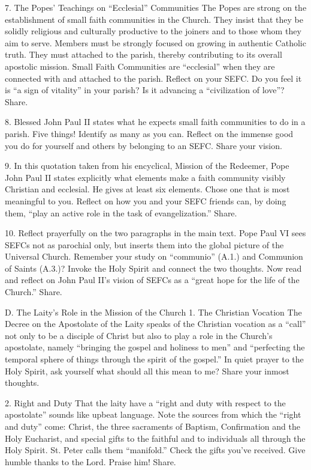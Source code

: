 \documentclass[oneside]{book}
\begin{document}
7. The Popes' Teachings on ``Ecclesial'' Communities
The Popes are strong on the establishment of small faith communities in the
Church. They insist that they be solidly religious and culturally productive to
the joiners and to those whom they aim to serve. Members must be strongly
focused on growing in authentic Catholic truth. They must attached to the
parish, thereby contributing to its overall apostolic mission. Small Faith
Communities are ``ecclesial'' when they are connected with and attached to the
parish. Reflect on your SEFC. Do you feel it is ``a sign of vitality'' in your
parish? Is it advancing a ``civilization of love''? Share.

8. Blessed John Paul II states what he expects small faith communities to do in
a parish. Five things! Identify as many as you can. Reflect on the immense good
you do for yourself and others by belonging to an SEFC. Share your vision.

9. In this quotation taken from his encyclical, Mission of the Redeemer, Pope
John Paul II states explicitly what elements make a faith community visibly
Christian and ecclesial. He gives at least six elements. Chose one that is most
meaningful to you. Reflect on how you and your SEFC friends can, by doing them,
``play an active role in the task of evangelization.'' Share.

10. Reflect prayerfully on the two paragraphs in the main text. Pope Paul VI
sees SEFCs not as parochial only, but inserts them into the global picture of
the Universal Church. Remember your study on ``communio'' (A.1.) and Communion
of Saints (A.3.)? Invoke the Holy Spirit and connect the two thoughts. Now read
and reflect on John Paul II's vision of SEFCs as a ``great hope for the life of
the Church.'' Share.

D. The Laity's Role in the Mission of the Church
1. The Christian Vocation
The Decree on the Apostolate of the Laity speaks of the Christian vocation as a
``call'' not only to be a disciple of Christ but also to play a role in the
Church's apostolate, namely ``bringing the gospel and holiness to men'' and
``perfecting the temporal sphere of things through the spirit of the gospel.''
In quiet prayer to the Holy Spirit, ask yourself what should all this mean to
me? Share your inmost thoughts.

2. Right and Duty
That the laity have a ``right and duty with respect to the apostolate'' sounds
like upbeat language. Note the sources from which the ``right and duty'' come:
Christ, the three sacraments of Baptism, Confirmation and the Holy Eucharist,
and special gifts to the faithful and to individuals  all through the Holy
Spirit. St. Peter calls them ``manifold.'' Check the gifts you've received. Give
humble thanks to the Lord. Praise him! Share.
\end{document}
